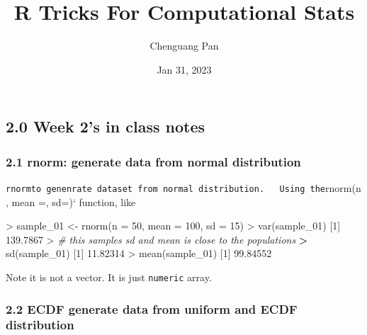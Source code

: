 \documentclass[
]{article}
\title{R Tricks For Computational Stats}
\author{Chenguang Pan}
\date{Jan 31, 2023}
\newenvironment{Shaded}{\begin{snugshade}}{\end{snugshade}}
\newcommand{\AttributeTok}[1]{\textcolor[rgb]{0.77,0.63,0.00}{#1}}
\newcommand{\CommentTok}[1]{\textcolor[rgb]{0.56,0.35,0.01}{\textit{#1}}}
\newcommand{\DecValTok}[1]{\textcolor[rgb]{0.00,0.00,0.81}{#1}}
\newcommand{\ErrorTok}[1]{\textcolor[rgb]{0.64,0.00,0.00}{\textbf{#1}}}
\newcommand{\FloatTok}[1]{\textcolor[rgb]{0.00,0.00,0.81}{#1}}
\newcommand{\FunctionTok}[1]{\textcolor[rgb]{0.00,0.00,0.00}{#1}}
\newcommand{\NormalTok}[1]{#1}
\newcommand{\OtherTok}[1]{\textcolor[rgb]{0.56,0.35,0.01}{#1}}
\newcommand{\SpecialCharTok}[1]{\textcolor[rgb]{0.00,0.00,0.00}{#1}}
\begin{document}
\maketitle

\hypertarget{week-2s-in-class-notes}{%
\subsection{2.0 Week 2's in class notes}\label{week-2s-in-class-notes}}

\hypertarget{rnorm-generate-data-from-normal-distribution}{%
\subsubsection{2.1 rnorm: generate data from normal
distribution}\label{rnorm-generate-data-from-normal-distribution}}

\texttt{rnorm\textasciigrave{}\textasciigrave{}to\ genenrate\ dataset\ from\ normal\ distribution.\ \ \ Using\ the}rnorm(n,
mean =, sd=)` function, like

\begin{Shaded}
\begin{Highlighting}[]
\SpecialCharTok{\textgreater{}}\NormalTok{ sample\_01 }\OtherTok{\textless{}{-}} \FunctionTok{rnorm}\NormalTok{(}\AttributeTok{n =} \DecValTok{50}\NormalTok{, }\AttributeTok{mean =} \DecValTok{100}\NormalTok{, }\AttributeTok{sd =} \DecValTok{15}\NormalTok{)}
\SpecialCharTok{\textgreater{}} \FunctionTok{var}\NormalTok{(sample\_01)}
\NormalTok{[}\DecValTok{1}\NormalTok{] }\FloatTok{139.7867}
\SpecialCharTok{\textgreater{}} \CommentTok{\# this sample\textquotesingle{}s sd and mean is close to the population\textquotesingle{}s}
\ErrorTok{\textgreater{}} \FunctionTok{sd}\NormalTok{(sample\_01)}
\NormalTok{[}\DecValTok{1}\NormalTok{] }\FloatTok{11.82314}
\SpecialCharTok{\textgreater{}} \FunctionTok{mean}\NormalTok{(sample\_01)}
\NormalTok{[}\DecValTok{1}\NormalTok{] }\FloatTok{99.84552}
\end{Highlighting}
\end{Shaded}

Note it is not a vector. It is just \texttt{numeric} array.

\hypertarget{ecdf-generate-data-from-uniform-and-ecdf-distribution}{%
\subsubsection{2.2 ECDF generate data from uniform and ECDF
distribution}\label{ecdf-generate-data-from-uniform-and-ecdf-distribution}}
\end{document}
